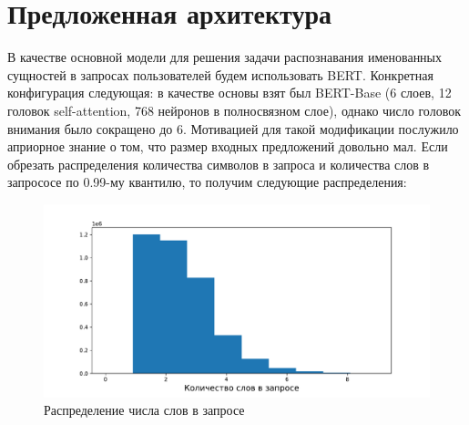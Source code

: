 \documentclass[12pt,a4paper]{article}
\begin{document}
\begin{table}[H]
\begin{center}
    \caption{Примеры размеченных запросов}
\end{center}
\end{table}

\section{Предложенная архитектура}

В качестве основной модели для решения задачи распознавания именованных сущностей в запросах пользователей будем использовать BERT. Конкретная конфигурация следующая: в качестве основы взят был BERT-Base (6 слоев, 12 головок self-attention, 768 нейронов в полносвязном слое), однако число головок внимания было сокращено до 6. Мотивацией для такой модификации послужило априорное знание о том, что размер входных предложений довольно мал. Если обрезать распределения количества символов в запроса и количества слов в запрососе по 0.99-му квантилю, то получим следующие распределения:

\begin{figure}[H]
	\begin{center}
		\includegraphics[scale=0.4]{nwords.pdf}
	\end{center}
	\caption{Распределение числа слов в запросе}
\end{figure}
\end{document}
